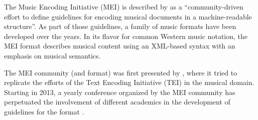 

The Music Encoding Initiative (MEI) is described by
\textcite{hankinson2011music} as a ``community-driven effort
to define guidelines for encoding musical documents in a
machine-readable structure''. As part of those guidelines, a
family of music formats have been developed over the years.
In its flavor for common Western music notation, the MEI
format describes musical content using an XML-based syntax
with an emphasis on musical semantics.


The MEI community (and format) was first presented by
\textcite{roland2002music}, where it tried to replicate the
efforts of the Text Encoding Initiative (TEI) in the musical
domain. Starting in 2013, a yearly conference organized by
the MEI community has perpetuated the involvement of
different academics in the development of guidelines for the
format \parencite{crawford2016review}.


